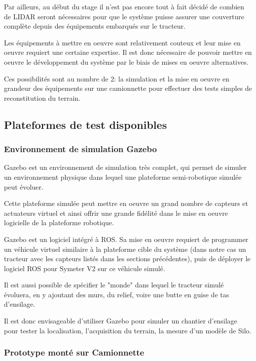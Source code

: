 \documentclass[12pt,a4paper]{report}
\begin{document}
		
		\para Par ailleurs, au début du stage il n'est pas encore tout à fait décidé de combien de LIDAR seront nécessaires pour que le système puisse assurer une couverture complète depuis des équipements embarqués sur le tracteur.
		
		\para Les équipements à mettre en oeuvre sont relativement couteux et leur mise en oeuvre requiert une certaine expertise. Il est donc nécessaire de pouvoir mettre en oeuvre le développement du système par le biais de mises en oeuvre alternatives.
		
		\para Ces possibilités sont au nombre de 2: la simulation et la mise en oeuvre en grandeur des équipements sur une camionnette pour effectuer des tests simples de reconstitution du terrain.
		
		\subsection{Plateformes de test disponibles}
			
			\subsubsection{Environnement de simulation Gazebo}
			
			Gazebo est un environnement de simulation très complet, qui permet de simuler un environnement physique dans lequel une plateforme semi-robotique simulée peut évoluer. 
			
			\para Cette plateforme simulée peut mettre en oeuvre un grand nombre de capteurs et actuateurs virtuel et ainsi offrir une grande fidélité dans le mise en oeuvre logicielle de la plateforme robotique.
			
			\para Gazebo est un logiciel intégré à ROS. Sa mise en oeuvre requiert de programmer un véhicule virtuel similaire à la plateforme cible du système (dans notre cas un tracteur avec les capteurs listés dans les sections précédentes), puis de déployer le logiciel ROS pour Symeter V2 sur ce véhicule simulé. 
			
			\para Il est aussi possible de spécifier le "monde" dans lequel le tracteur simulé évoluera, en y ajoutant des murs, du relief, voire une butte en guise de tas d'ensilage.

			
			\para Il est donc envisageable d'utiliser Gazebo pour simuler un chantier d'ensilage pour tester la localisation, l'acquisition du terrain, la mesure d'un modèle de Silo.
			
			\subsubsection{Prototype monté sur Camionnette}
			
\end{document}
